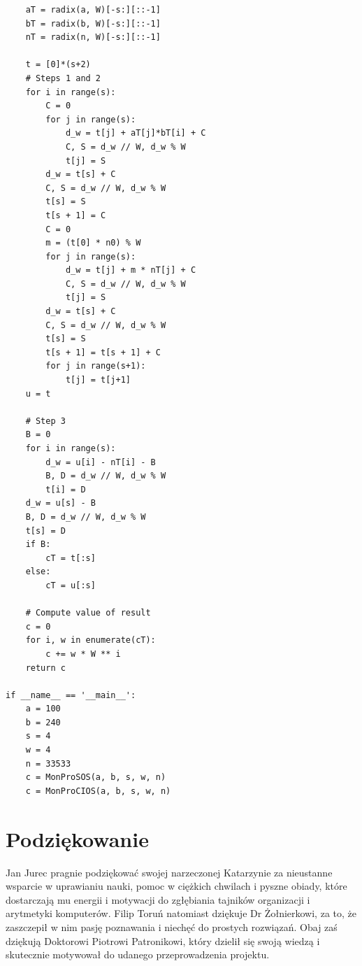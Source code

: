 \documentclass[10pt,journal,compsoc]{IEEEtran}
\begin{document}
\begin{lstlisting}
    aT = radix(a, W)[-s:][::-1]
    bT = radix(b, W)[-s:][::-1]
    nT = radix(n, W)[-s:][::-1]

    t = [0]*(s+2)
    # Steps 1 and 2
    for i in range(s):
        C = 0
        for j in range(s):
            d_w = t[j] + aT[j]*bT[i] + C
            C, S = d_w // W, d_w % W
            t[j] = S
        d_w = t[s] + C
        C, S = d_w // W, d_w % W
        t[s] = S
        t[s + 1] = C
        C = 0
        m = (t[0] * n0) % W
        for j in range(s):
            d_w = t[j] + m * nT[j] + C
            C, S = d_w // W, d_w % W
            t[j] = S
        d_w = t[s] + C
        C, S = d_w // W, d_w % W
        t[s] = S
        t[s + 1] = t[s + 1] + C
        for j in range(s+1):
            t[j] = t[j+1]
    u = t

    # Step 3
    B = 0
    for i in range(s):
        d_w = u[i] - nT[i] - B
        B, D = d_w // W, d_w % W
        t[i] = D
    d_w = u[s] - B
    B, D = d_w // W, d_w % W
    t[s] = D
    if B:
        cT = t[:s]
    else:
        cT = u[:s]

    # Compute value of result
    c = 0
    for i, w in enumerate(cT):
        c += w * W ** i
    return c

if __name__ == '__main__':
    a = 100
    b = 240
    s = 4
    w = 4
    n = 33533
    c = MonProSOS(a, b, s, w, n)
    c = MonProCIOS(a, b, s, w, n)
\end{lstlisting} 


\section*{Podziękowanie}

Jan Jurec pragnie podziękować swojej narzeczonej Katarzynie za nieustanne wsparcie w uprawianiu nauki, pomoc w ciężkich chwilach i pyszne obiady, które dostarczają mu energii i motywacji do zgłębiania tajników organizacji i arytmetyki komputerów.
Filip Toruń natomiast dziękuje Dr Żołnierkowi, za to, że zaszczepił w nim pasję poznawania i niechęć do prostych rozwiązań.
Obaj zaś dziękują Doktorowi Piotrowi Patronikowi, który dzielił się swoją wiedzą i skutecznie motywował do udanego przeprowadzenia projektu.
\end{document}
